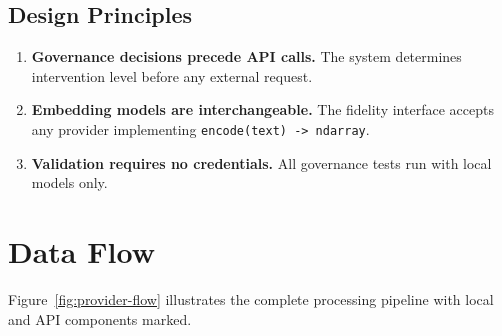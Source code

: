 \documentclass[11pt,twocolumn]{article}
\begin{document}
\subsection{Design Principles}

\begin{enumerate}
    \item \textbf{Governance decisions precede API calls.} The system determines intervention level before any external request.
    \item \textbf{Embedding models are interchangeable.} The fidelity interface accepts any provider implementing \texttt{encode(text) -> ndarray}.
    \item \textbf{Validation requires no credentials.} All governance tests run with local models only.
\end{enumerate}

\section{Data Flow}

Figure~\ref{fig:provider-flow} illustrates the complete processing pipeline with local and API components marked.
\end{document}
